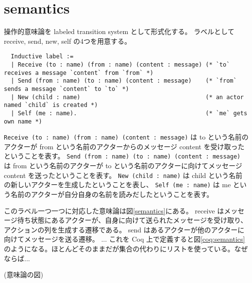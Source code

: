 \section{semantics}

操作的意味論を labeled transition system として形式化する。
ラベルとして receive, send, new, self の4つを用意する。

\begin{lstlisting}
  Inductive label :=
  | Receive (to : name) (from : name) (content : message) (* `to` receives a message `content` from `from` *)
  | Send (from : name) (to : name) (content : message)    (* `from` sends a message `content` to `to` *)
  | New (child : name)                                    (* an actor named `child` is created *)
  | Self (me : name).                                     (* `me` gets own name *)
\end{lstlisting}

\texttt{Receive (to : name) (from : name) (content : message)} は to という名前のアクターが from という名前のアクターからのメッセージ content を受け取ったということを表す。
\texttt{Send (from : name) (to : name) (content : message)} は from という名前のアクターが to という名前のアクターに向けてメッセージ content を送ったということを表す。
\texttt{New (child : name)} は child という名前の新しいアクターを生成したということを表し、
\texttt{Self (me : name)} は me という名前のアクターが自分自身の名前を読みだしたということを表す。

このラベル一つ一つに対応した意味論は図\ref{semantics}にある。
receive はメッセージ待ち状態にあるアクターが、自身に向けて送られたメッセージを受け取り、アクションの列を生成する遷移である。
send はあるアクターが他のアクターに向けてメッセージを送る遷移。
...
これを Coq 上で定義すると図\ref{coq:semantics}のようになる。ほとんどそのままだが集合の代わりにリストを使っている。なぜならば...

(意味論の図)



